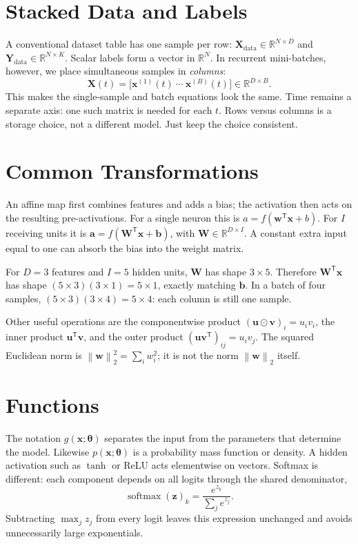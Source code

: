 \documentclass[11pt, oneside]{book}
\newcommand{\R}{\mathbb{R}}
\newcommand{\norm}[1]{\left\lVert #1 \right\rVert}
\newcommand{\T}{^{\mathsf{T}}}           %
\newcommand{\params}{\boldsymbol{\theta}}   %
\DeclareMathOperator{\softmax}{softmax}
\let\originalsection\section
\renewcommand{\section}{\Needspace{7\baselineskip}\originalsection}
\begin{document}
\section{Stacked Data and Labels}\label{sec:source-0-5}
A conventional dataset table has one sample per row: $\mathbf{X}_{\mathrm{data}}\in\R^{N\times D}$ and $\mathbf{Y}_{\mathrm{data}}\in\R^{N\times K}$. Scalar labels form a vector in $\R^N$. In recurrent mini-batches, however, we place simultaneous samples in \emph{columns}:
\[
 \mathbf{X}(t)=\bigl[\mathbf{x}^{(1)}(t)\ \cdots\ \mathbf{x}^{(B)}(t)\bigr]
 \in\R^{D\times B}.
\]
This makes the single-sample and batch equations look the same. Time remains a separate axis: one such matrix is needed for each $t$. Rows versus columns is a storage choice, not a different model. Just keep the choice consistent.

\section{Common Transformations}\label{sec:source-0-6}
An affine map first combines features and adds a bias; the activation then acts on the resulting pre-activations. For a single neuron this is $a=f(\mathbf{w}\T\mathbf{x}+b)$. For $I$ receiving units it is $\mathbf{a}=f(\mathbf{W}\T\mathbf{x}+\mathbf{b})$, with $\mathbf{W}\in\R^{D\times I}$. A constant extra input equal to one can absorb the bias into the weight matrix.

\begin{exbox}[title={A shape check that catches transpose errors}]
For $D=3$ features and $I=5$ hidden units, $\mathbf{W}$ has shape $3\times5$. Therefore $\mathbf{W}\T\mathbf{x}$ has shape $(5\times3)(3\times1)=5\times1$, exactly matching $\mathbf{b}$. In a batch of four samples, $(5\times3)(3\times4)=5\times4$: each column is still one sample.
\end{exbox}

Other useful operations are the componentwise product $(\mathbf{u}\odot\mathbf{v})_i=u_iv_i$, the inner product $\mathbf{u}\T\mathbf{v}$, and the outer product $(\mathbf{u}\mathbf{v}\T)_{ij}=u_iv_j$. The squared Euclidean norm is $\norm{\mathbf{w}}_2^2=\sum_i w_i^2$; it is not the norm $\norm{\mathbf{w}}_2$ itself.

\section{Functions}\label{sec:source-0-7}
The notation $g(\mathbf{x};\params)$ separates the input from the parameters that determine the model. Likewise $p(\mathbf{x};\params)$ is a probability mass function or density. A hidden activation such as $\tanh$ or ReLU acts elementwise on vectors. Softmax is different: each component depends on all logits through the shared denominator,
\[
 \softmax(\mathbf{z})_k=\frac{e^{z_k}}{\sum_j e^{z_j}}.
\]
Subtracting $\max_j z_j$ from every logit leaves this expression unchanged and avoids unnecessarily large exponentials.
\end{document}
